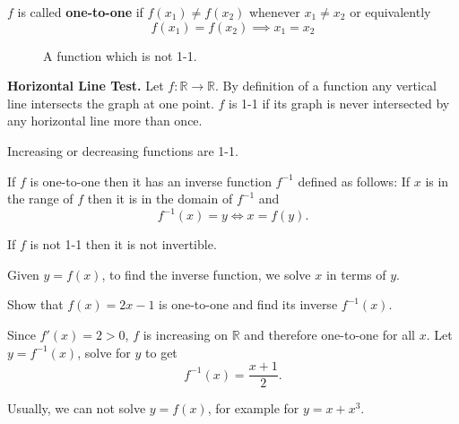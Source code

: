 \documentclass[../main.tex]{subfiles}
\begin{document}
  \begin{definition}
    $f$ is called \textbf{one-to-one} if $f(x_1) \neq f(x_2)$ whenever $x_1 \neq x_2$ or equivalently
    \[
      f(x_1) = f(x_2) \implies x_1 = x_2
    \]
  \end{definition}

  \begin{figure}[H]
   \centering
   
   \caption{A function which is not 1-1.}
 \end{figure}

 \textbf{Horizontal Line Test.}
 Let $f: \mathbb{R} \to \mathbb{R}$. By definition of a function any vertical line intersects the graph at one point. $f$ is 1-1 if its graph is never intersected by any horizontal line more than once.

 \begin{theorem}
  Increasing or decreasing functions are 1-1.
\end{theorem}

\begin{definition}
  If $f$ is one-to-one then it has an inverse function $f^{-1}$ defined as follows: If $x$ is in the range of $f$ then it is in the domain of $f^{-1}$ and
  \[
    f^{-1}(x) = y \iff x = f(y).
  \]
\end{definition}
If $f$ is not 1-1 then it is not invertible.

Given $y=f(x)$, to find the inverse function, we solve $x$ in terms of $y$.
\begin{example}
  Show that $f(x) = 2x -1$ is one-to-one and find its inverse $f^{-1}(x)$.
\end{example}
\begin{solution}
  Since $f'(x) = 2 >0$, $f$ is increasing on $\mathbb{R}$ and therefore one-to-one for all $x$. Let $y = f^{-1}(x)$, solve for $y$ to get
  \[
    f^{-1}(x) = \frac{x+1}{2}.
  \]
\end{solution}

Usually, we can not solve $y=f(x)$, for example for $y=x+x^3$.
\end{document}
